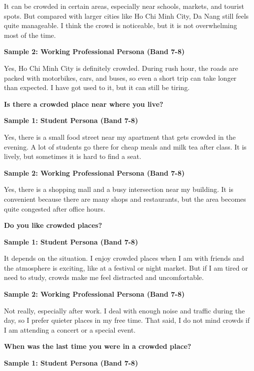 It can be crowded in certain areas, especially near schools, markets, and tourist spots. But compared with larger cities like Ho Chi Minh City, Da Nang still feels quite manageable. I think the crowd is noticeable, but it is not overwhelming most of the time.

\textbf{Sample 2: Working Professional Persona (Band 7-8)}

Yes, Ho Chi Minh City is definitely crowded. During rush hour, the roads are packed with motorbikes, cars, and buses, so even a short trip can take longer than expected. I have got used to it, but it can still be tiring.

\separator

\begin{ieltsquestion}
\textbf{Is there a crowded place near where you live?}
\end{ieltsquestion}
\textbf{Sample 1: Student Persona (Band 7-8)}

Yes, there is a small food street near my apartment that gets crowded in the evening. A lot of students go there for cheap meals and milk tea after class. It is lively, but sometimes it is hard to find a seat.

\textbf{Sample 2: Working Professional Persona (Band 7-8)}

Yes, there is a shopping mall and a busy intersection near my building. It is convenient because there are many shops and restaurants, but the area becomes quite congested after office hours.

\separator

\begin{ieltsquestion}
\textbf{Do you like crowded places?}
\end{ieltsquestion}
\textbf{Sample 1: Student Persona (Band 7-8)}

It depends on the situation. I enjoy crowded places when I am with friends and the atmosphere is exciting, like at a festival or night market. But if I am tired or need to study, crowds make me feel distracted and uncomfortable.

\textbf{Sample 2: Working Professional Persona (Band 7-8)}

Not really, especially after work. I deal with enough noise and traffic during the day, so I prefer quieter places in my free time. That said, I do not mind crowds if I am attending a concert or a special event.

\separator

\begin{ieltsquestion}
\textbf{When was the last time you were in a crowded place?}
\end{ieltsquestion}
\textbf{Sample 1: Student Persona (Band 7-8)}

